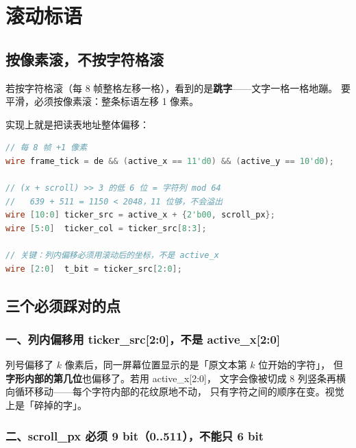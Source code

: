 \documentclass[10pt,a4paper]{article}
\newcommand{\sig}[1]{{\ttfamily\small #1}}
\newcommand{\code}[1]{{\ttfamily\small #1}}
\begin{document}
\section{滚动标语}
\label{sec:scroll}

\subsection{按像素滚，不按字符格滚}

若按字符格滚（每 8 帧整格左移一格），看到的是\textbf{跳字}——文字一格一格地蹦。
要平滑，必须按像素滚：整条标语左移 1 像素。

实现上就是把读表地址整体偏移：

\begin{lstlisting}[language=Verilog,caption={滚动坐标（\sig{osd\_caption.v}）},label={lst:scroll}]
// 每 8 帧 +1 像素
wire frame_tick = de && (active_x == 11'd0) && (active_y == 10'd0);

// (x + scroll) >> 3 的低 6 位 = 字符列 mod 64
//   639 + 511 = 1150 < 2048，11 位够，不会溢出
wire [10:0] ticker_src = active_x + {2'b00, scroll_px};
wire [5:0]  ticker_col = ticker_src[8:3];

// 关键：列内偏移必须用滚动后的坐标，不是 active_x
wire [2:0]  t_bit = ticker_src[2:0];
\end{lstlisting}

\subsection{三个必须踩对的点}

\subsubsection*{一、列内偏移用 \code{ticker\_src[2:0]}，不是 \code{active\_x[2:0]}}

列号偏移了 $k$ 像素后，同一屏幕位置显示的是「原文本第 $k$ 位开始的字符」，
但\textbf{字形内部的第几位}也偏移了。若用 \code{active\_x[2:0]}，
文字会像被切成 8 列竖条再横向循环移动——每个字符内部的花纹原地不动，
只有字符之间的顺序在变。视觉上是「碎掉的字」。

\subsubsection*{二、\code{scroll\_px} 必须 9 bit（0..511），不能只 6 bit}
\end{document}
